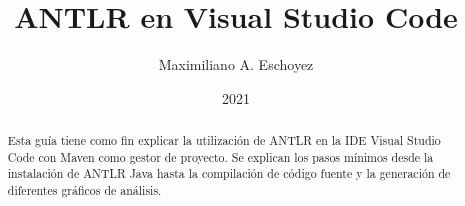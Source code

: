 \documentclass[a5paper,10pt]{article}
\author{Maximiliano A. Eschoyez}
\title{ANTLR en Visual Studio Code}
\date{2021}
\begin{document}
\maketitle


\begin{abstract}
	Esta guía tiene como fin explicar la utilización de ANTLR en la IDE Visual Studio Code con Maven como gestor de proyecto.  Se explican los pasos mínimos desde la instalación de ANTLR Java hasta la compilación de código fuente y la generación de diferentes gráficos de análisis.
\end{abstract}






\end{document}
